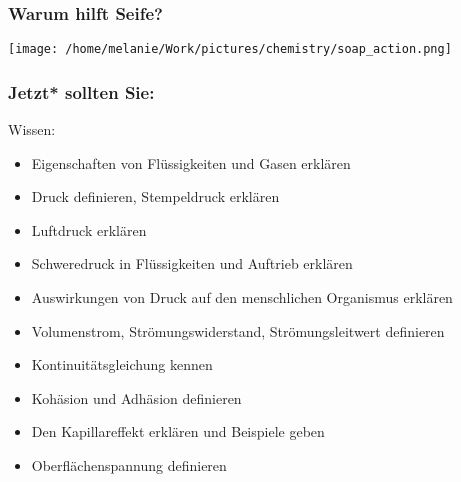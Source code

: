 \documentclass{beamer}
\begin{document}
\begin{frame}
\frametitle{Warum hilft Seife?}

\begin{center}
\texttt{[image: /home/melanie/Work/pictures/chemistry/soap\_action.png]}
\end{center}

\end{frame}





\begin{frame}

\frametitle{Jetzt* sollten Sie:}



\begin{block}{Wissen:}
\begin{itemize}
\item
Eigenschaften von Flüssigkeiten und Gasen erklären
\item
Druck definieren, Stempeldruck erklären
\item
Luftdruck erklären 
\item
Schweredruck in Flüssigkeiten und Auftrieb erklären
\item
Auswirkungen von Druck auf den menschlichen Organismus erklären
\item
Volumenstrom, Strömungswiderstand, Strömungsleitwert definieren 
\item
Kontinuitätsgleichung kennen 
\item
Kohäsion und Adhäsion definieren
\item
Den Kapillareffekt erklären und Beispiele geben
\item
Oberflächenspannung definieren
\end{itemize}

\end{block}

\end{frame}
\end{document}
